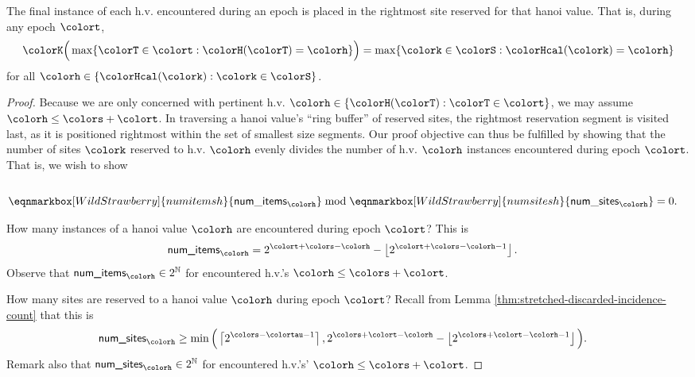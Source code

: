 \begin{lemma}
\label{thm:tilted-last-touched}
The final instance of each h.v. encountered during an epoch is placed in the rightmost site reserved for that hanoi value.
That is, during any epoch $\colort$,
\begin{align*}
\colorK\Big(
  \max\{\colorT \in \colort : \colorH(\colorT) = \colorh\}
\Big)
=
\max\{\colork \in \colorS : \colorHcal(\colork) = \colorh \}
\end{align*}
for all $\colorh \in \{\colorHcal(\colork) : \colork \in \colorS\}$.
\end{lemma}

\begin{proof}
Because we are only concerned with pertinent h.v. $\colorh \in \{\colorH(\colorT) : \colorT \in \colort\}$, we may assume $\colorh \leq \colors + \colort$.
In traversing a hanoi value's ``ring buffer'' of reserved sites, the rightmost reservation segment is visited last, as it is positioned rightmost within the set of smallest size segments.
Our proof objective can thus be fulfilled by showing that the number of sites $\colork$ reserved to h.v. $\colorh$ evenly divides the number of h.v. $\colorh$ instances encountered during epoch $\colort$.
That is, we wish to show
\begin{align*}
\\
\eqnmarkbox[WildStrawberry]{numitemsh}{
  \mathsf{num\_items}_{\colorh}
}
\bmod
\eqnmarkbox[WildStrawberry]{numsitesh}{
  \mathsf{num\_sites}_{\colorh}
}
&= 0.
\end{align*}


How many instances of a hanoi value $\colorh$ are encountered during epoch $\colort$?
This is
\begin{align*}
\textsf{num\_items}_{\colorh}
&=
2^{\colort + \colors - \colorh} - \left\lfloor2^{\colort + \colors - \colorh - 1} \right\rfloor.
\end{align*}
Observe that $\textsf{num\_items}_{\colorh} \in 2^{\mathbb{N}}$ for encountered h.v.'s $\colorh \leq \colors + \colort$.

How many sites are reserved to a hanoi value $\colorh$ during epoch $\colort$?
Recall from Lemma \ref{thm:stretched-discarded-incidence-count} that this is
\begin{align*}
\textsf{num\_sites}_{\colorh}
&\geq
\min\Big(
\left\lceil 2^{\colors - \colortau - 1} \right\rceil,
2^{\colors + \colort - \colorh} - \left\lfloor 2^{\colors + \colort - \colorh - 1} \right\rfloor
\Big).
\end{align*}
Remark also that $\textsf{num\_sites}_{\colorh} \in 2^{\mathbb{N}}$ for encountered h.v.'s' $\colorh \leq \colors + \colort$.


\end{proof}
